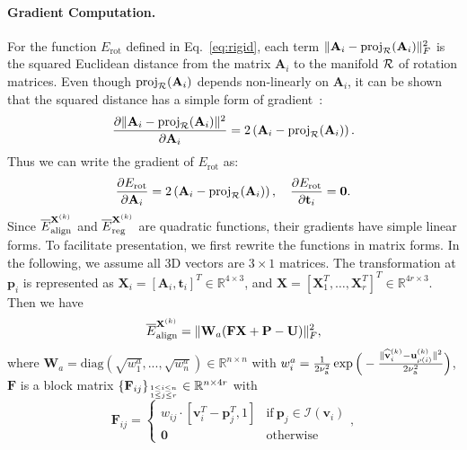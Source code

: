 \paragraph{Gradient Computation.}
For the function $E_{\text{rot}}$ defined in Eq.~\eqref{eq:rigid}, each term $\|\mathbf{A}_i - \operatorname*{proj}\nolimits_{\mathcal{R}}(\mathbf{A}_i)\|_F^2$ is the squared Euclidean distance from the matrix $\mathbf{A}_i$ to the manifold ${\mathcal{R}}$ of rotation matrices. Even though $\operatorname*{proj}\nolimits_{\mathcal{R}}(\mathbf{A}_i)$ depends non-linearly on $\mathbf{A}_i$,  it can be shown that the squared distance has a simple form of gradient~\cite{Gomes2003}:
\[
    \frac{\partial \| \mathbf{A}_i - \operatorname*{proj}\nolimits_{\mathcal{R}}(\mathbf{A}_i) \|^2}{\partial \mathbf{A}_i} = 2 \left(\mathbf{A}_i - \operatorname*{proj}\nolimits_{\mathcal{R}}(\mathbf{A}_i)\right).
\]
Thus we can write the gradient of  $E_{\text{rot}}$ as:
\[
    \frac{\partial E_{\text{rot}}}{\partial \mathbf{A}_i} =  2 \left(\mathbf{A}_i - \operatorname*{proj}\nolimits_{\mathcal{R}}(\mathbf{A}_i)\right),
    \quad
    \frac{\partial E_{\text{rot}}}{\partial \mathbf{t}_i} = \mathbf{0}.
\]
Since $\overline{E}_{\text{align}}^{\mathbf{X}^{(k)}}$ and $\overline{E}_{\text{reg}}^{\mathbf{X}^{(k)}}$ are quadratic functions, their gradients have simple linear forms. To facilitate presentation, we first rewrite the functions in matrix forms. In the following, we assume all 3D vectors are $3 \times 1$ matrices. The transformation at $\mathbf{p}_i$ is represented as $\mathbf{X}_i = [\mathbf{A}_i, \mathbf{t}_i]^T \in \mathbb{R}^{4 \times 3}$, and $\mathbf{X} = [ \mathbf{X}_1^T, \ldots, \mathbf{X}_r^T  ]^T \in \mathbb{R}^{4r \times 3}$. Then we have
\begin{equation}
     \overline{E}_{\text{align}}^{\mathbf{X}^{(k)}}=\|\mathbf{W}_a (\mathbf{F}\mathbf{X}+\mathbf{P}-\mathbf{U})\|_F^2,
    \label{eq:alignMatrixForm}
\end{equation}
where $\mathbf{W}_a = \text{diag}(\sqrt{w_1^a},...,\sqrt{w_n^a}) \in \mathbb{R}^{n \times n}$ with
$
w_i^a = \frac{1}{2 \nu_{\textrm{a}}^2}  \exp\Big(-\frac{\|\widehat{\mathbf{v}}_i^{(k)} -\mathbf{u}_{\rho(i)}^{(k)}\|^2}{2 \nu_{\textrm{a}}^2}\Big)
$,
$\mathbf{F}$ is a block matrix  $\{\mathbf{F}_{ij}\}_{1 \leq i \leq n \atop 1 \leq j \leq r} \in \mathbb{R}^{n \times 4r}$ with
\[
\mathbf{F}_{ij}
    = \left\{
    \begin{array}{ll}
    w_{ij} \cdot [ \mathbf{v}_i^T - \mathbf{p}_j^T, 1 ] & \textrm{if}~\mathbf{p}_j \in \mathcal{I}(\mathbf{v}_i)\\
    \mathbf{0} & \textrm{otherwise}
    \end{array}
    \right.,
\]
